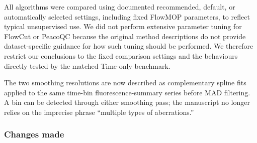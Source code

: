 \documentclass[
  11pt,
  a4paper,
]{article}
\begin{document}
All algorithms were compared using documented recommended, default, or
automatically selected settings, including fixed FlowMOP parameters, to
reflect typical unsupervised use. We did not perform extensive parameter
tuning for FlowCut or PeacoQC because the original method descriptions
do not provide dataset-specific guidance for how such tuning should be
performed. We therefore restrict our conclusions to the fixed comparison
settings and the behaviours directly tested by the matched Time-only
benchmark.

The two smoothing resolutions are now described as complementary spline
fits applied to the same time-bin fluorescence-summary series before MAD
filtering. A bin can be detected through either smoothing pass; the
manuscript no longer relies on the imprecise phrase ``multiple types of
aberrations.''

\subsubsection{Changes made}\label{changes-made-3}
\end{document}
